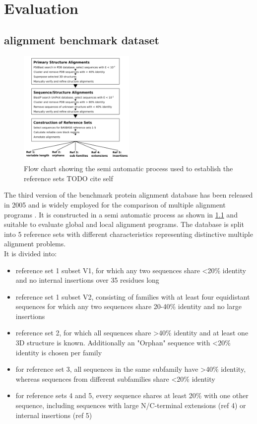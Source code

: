 \chapter{Evaluation}

\section{ alignment benchmark dataset}
\begin{figure}
	\centering
	\includegraphics[width=0.5\textwidth]{./images/balibase.png}
	\caption{Flow chart showing the semi automatic process used to establish the reference sets TODO cite self}
	\label{fig:balibase}
\end{figure}

The third version of the \bb benchmark protein alignment database has been released in 2005 and is widely employed for the comparison of multiple alignment programs \cite{thompson2005balibase, Russell2016}. It is constructed in a semi automatic process as shown in \cref{fig:balibase} and suitable to evaluate global and local alignment programs. The database is split into 5 reference sets with different characteristics representing distinctive multiple alignment problems. \\
It is divided into:



\begin{itemize}
	\item reference set 1 subset V1, for which any two sequences share <20\% identity and no internal insertions over 35 residues long
	\item reference set 1 subset V2, consisting of families with at least four equidistant sequences for which any two sequences share 20-40\% identity and no large insertions
	\item reference set 2, for which all sequences share >40\% identity and at least one 3D structure is known. Additionally an "Orphan" sequence with <20\% identity is chosen per family
	\item for reference set 3, all sequences in the same subfamily have >40\% identity, whereas sequences from different subfamilies share <20\% identity
	\item for reference sets 4 and 5, every sequence shares at least 20\% with one other sequence, including sequences with large N/C-terminal extensions (ref 4) or internal insertions (ref 5)
\end{itemize}

